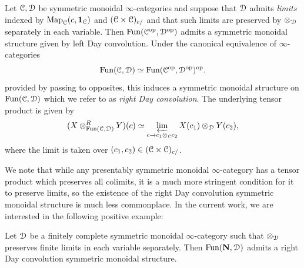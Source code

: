 \documentclass[oneside,a4paper]{amsart}
\begin{document}
\begin{variant}
\label{variant:right_day_convolution}
Let $\EuScript{C}, \EuScript{D}$ be symmetric monoidal $\infty$-categories and suppose that $\EuScript{D}$ admits \emph{limits} indexed by $\mathrm{Map}_{\EuScript{C}}(c, \mathbf{1}_{\EuScript{C}})$ and $(\EuScript{C} \times \EuScript{C})_{c / }$ and that such limits are preserved by $\otimes_{\EuScript{D}}$ separately in each variable. Then $\mathrm{Fun}(\EuScript{C}^{\mathrm{op}}, \EuScript{D}^{\mathrm{op}})$ admits a symmetric monoidal structure given by left Day convolution. Under the canonical equivalence of $\infty$-categories 
\[
\mathrm{Fun}(\EuScript{C}, \EuScript{D}) \simeq \mathrm{Fun}(\EuScript{C}^{\mathrm{op}}, \EuScript{D}^{\mathrm{op}})^{\mathrm{op}}.
\]
provided by passing to opposites, this induces a symmetric monoidal structure on $\mathrm{Fun}(\EuScript{C}, \EuScript{D})$ which we refer to as \emph{right Day convolution}. The underlying tensor product is given by 
\begin{equation}
\label{equation:formula_for_right_day_convolution}
(X \otimes_{\mathrm{Fun}(\EuScript{C}, \EuScript{D})}^{R} Y)(c) \simeq \varprojlim_{c \rightarrow c_{1} \otimes_{\EuScript{C}} c_{2}} X(c_{1}) \otimes_{\EuScript{D}} Y(c_{2}), 
\end{equation}
where the limit is taken over $(c_{1}, c_{2}) \in (\EuScript{C} \times \EuScript{C})_{c / }$. 
\end{variant}

We note that while any presentably symmetric monoidal $\infty$-category has a tensor product which preserves all colimits, it is a much more stringent condition for it to preserve limits, so the existence of the right Day convolution symmetric monoidal structure is much less commonplace. In the current work, we are interested in the following positive example: 

\begin{proposition}
\label{proposition:existence_of_right_day_for_fun_n_d_with_d_finitely_complete}
Let $\EuScript{D}$ be a finitely complete symmetric monoidal $\infty$-category such that $\otimes_{\EuScript{D}}$ preserves finite limits in each variable separately. Then $\mathrm{Fun}(\mathbf{N}, \EuScript{D})$ admits a right Day convolution symmetric monoidal structure. 
\end{proposition}
\end{document}
